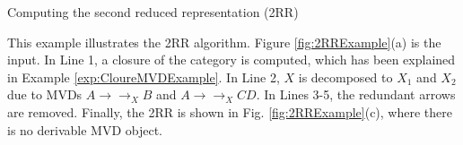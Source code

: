 
 









\begin{algorithm}
\caption{Computing the second reduced representation (2RR)}
\label{alg:2RR}

\end{algorithm}







\begin{example}  This example illustrates the 2RR algorithm. Figure  \ref{fig:2RRExample}(a) is the input. In Line 1, a closure of the category is computed, which has been explained in Example \ref{exp:CloureMVDExample}.  In Line 2,  $X$  is decomposed to $X_1$ and $X_2$ due to MVDs $A \to\to_X B$ and $A \to\to_X CD$.  In Lines 3-5, the redundant arrows are removed. Finally, the 2RR is shown in Fig. \ref{fig:2RRExample}(c), where there is no derivable MVD object. 
\label{exp:2RRExample} \end{example}







